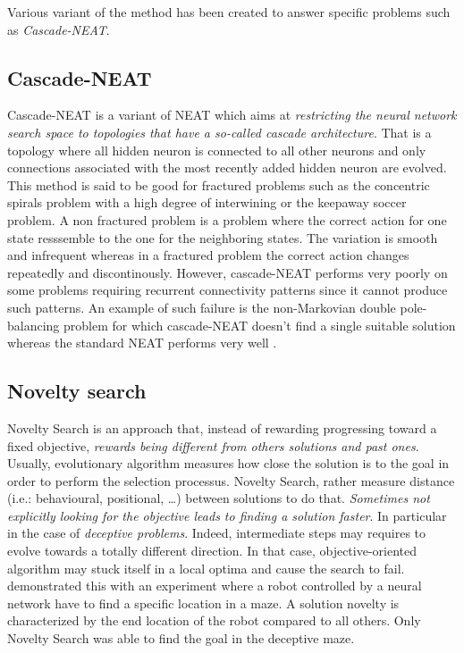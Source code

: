 Various variant of the method has been created to answer specific
problems such as \emph{Cascade-NEAT}.

\subsection{Cascade-NEAT}\label{subsec:cascade-neat}

Cascade-NEAT is a variant of NEAT which aims at \emph{restricting the neural network
search space to topologies that have a so-called cascade architecture}. That is
a topology where all hidden neuron is connected to all other neurons and
only connections associated with the most recently added hidden neuron are evolved.
This method is said to be good for fractured problems such as the concentric spirals
problem with a high degree of interwining or the keepaway soccer problem.
A non fractured problem is a problem where the correct action for one state
resssemble to the one for the neighboring states. The variation is smooth
and infrequent whereas in a fractured problem the correct action changes
repeatedly and discontinously.
However, cascade-NEAT performs very poorly on some problems requiring recurrent
connectivity patterns since it cannot produce such patterns. An example of
such failure is the non-Markovian double pole-balancing problem for which
cascade-NEAT doesn't find a single suitable solution whereas the standard NEAT
performs very well \cite{KoAS09} \cite{KoMi09}.

\subsection{Novelty search}\label{subsec:novelty-search}

Novelty Search is an approach that, instead of rewarding progressing toward a
fixed objective, \emph{rewards being different from others solutions and past ones}.
Usually, evolutionary algorithm measures how close the solution is to the goal
in order to perform the selection processus. Novelty Search, rather measure
distance (i.e.: behavioural, positional, …) between solutions to do that.
\emph{Sometimes not explicitly looking for the objective
leads to finding a solution faster}.
In particular in the case of \emph{deceptive problems}. Indeed, intermediate steps
may requires to evolve towards a totally different direction.
In that case, objective-oriented algorithm may stuck itself
in a local optima and cause the search to fail.
\citet{LeSt11} demonstrated this with an experiment where a robot controlled by a
neural network have to find a specific location in a maze.
A solution novelty is characterized by the end location of the robot
compared to all others. Only Novelty Search was able
to find the goal in the deceptive maze.

